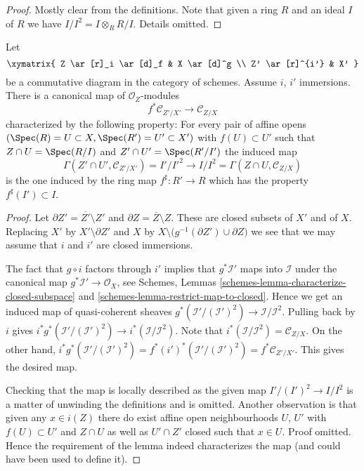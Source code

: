 \begin{proof}
Mostly clear from the definitions. Note that given a ring $R$ and
an ideal $I$ of $R$ we have $I/I^2 = I \otimes_R R/I$. Details omitted.
\end{proof}

\begin{lemma}
\label{lemma-conormal-functorial}
Let
$$
\xymatrix{
Z \ar[r]_i \ar[d]_f & X \ar[d]^g \\
Z' \ar[r]^{i'} & X'
}
$$
be a commutative diagram in the category of schemes.
Assume $i$, $i'$ immersions. There is a canonical map
of $\mathcal{O}_Z$-modules
$$
f^*\mathcal{C}_{Z'/X'}
\longrightarrow
\mathcal{C}_{Z/X}
$$
characterized by the following property: For every pair of affine opens
$(\Spec(R) = U \subset X, \Spec(R') = U' \subset X')$ with
$f(U) \subset U'$ such that
$Z \cap U = \Spec(R/I)$ and $Z' \cap U' = \Spec(R'/I')$
the induced map
$$
\Gamma(Z' \cap U', \mathcal{C}_{Z'/X'}) = I'/I'^2
\longrightarrow
I/I^2 = \Gamma(Z \cap U, \mathcal{C}_{Z/X})
$$
is the one induced by the ring map $f^\sharp : R' \to R$ which
has the property $f^\sharp(I') \subset I$.
\end{lemma}

\begin{proof}
Let $\partial Z' = \overline{Z'} \setminus Z'$ and
$\partial Z = \overline{Z} \setminus Z$. These are closed subsets of $X'$ and
of $X$. Replacing $X'$ by $X' \setminus \partial Z'$ and $X$ by
$X \setminus \big(g^{-1}(\partial Z') \cup \partial Z\big)$ we
see that we may assume that $i$ and $i'$ are closed immersions.

\medskip\noindent
The fact that $g \circ i$ factors through $i'$ implies that
$g^*\mathcal{I}'$ maps into $\mathcal{I}$ under the canonical
map $g^*\mathcal{I}' \to \mathcal{O}_X$, see
Schemes, Lemmas
\ref{schemes-lemma-characterize-closed-subspace} and
\ref{schemes-lemma-restrict-map-to-closed}.
Hence we get an induced map of quasi-coherent sheaves
$g^*(\mathcal{I}'/(\mathcal{I}')^2) \to \mathcal{I}/\mathcal{I}^2$.
Pulling back by $i$ gives
$i^*g^*(\mathcal{I}'/(\mathcal{I}')^2) \to i^*(\mathcal{I}/\mathcal{I}^2)$.
Note that $i^*(\mathcal{I}/\mathcal{I}^2) = \mathcal{C}_{Z/X}$.
On the other hand,
$i^*g^*(\mathcal{I}'/(\mathcal{I}')^2) =
f^*(i')^*(\mathcal{I}'/(\mathcal{I}')^2) = f^*\mathcal{C}_{Z'/X'}$.
This gives the desired map.

\medskip\noindent
Checking that the map is locally described as the given map
$I'/(I')^2 \to I/I^2$ is a matter of unwinding the definitions
and is omitted. Another observation is that given any
$x \in i(Z)$ there do exist affine open neighbourhoods $U$, $U'$
with $f(U) \subset U'$ and $Z \cap U$ as well as $U' \cap Z'$
closed such that $x \in U$. Proof omitted. Hence the requirement
of the lemma indeed characterizes the map (and could have been used
to define it).
\end{proof}

